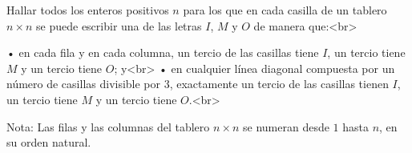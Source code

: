 Hallar todos los enteros positivos $n$ para los que en cada casilla de un tablero $n \times n$ se puede escribir una de las letras $I$, $M$ y $O$ de manera que:<br>

 •  en cada fila y en cada columna, un tercio de las casillas tiene $I$, un tercio tiene $M$ y un tercio tiene $O$; y<br>
 • en cualquier línea diagonal compuesta por un número de casillas divisible por $3$, exactamente un tercio de las casillas tienen $I$, un tercio tiene $M$ y un tercio tiene $O$.<br>

Nota: Las filas y las columnas del tablero $n \times n$ se numeran desde $1$ hasta $n$, en su orden natural. 
